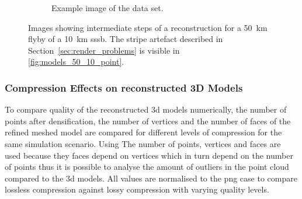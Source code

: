 \begin{figure}[htb]
\begin{subfigure}[b]{0.42\textwidth}
            \caption{Example image of the data set.}
            \label{fig:models_50_10_img}
        \end{subfigure}
    \caption{Images showing intermediate steps of a reconstruction for a \SI{50}{\kilo\meter} flyby of a \SI{10}{\kilo\meter} \gls{sssb}. The stripe artefact described in Section~\ref{sec:render_problems} is visible in \ref{fig:models_50_10_point}.}
    \label{fig:models_50_10}
\end{figure}


\subsubsection{Compression Effects on reconstructed 3D Models}
To compare  quality of the reconstructed \gls{3d} models numerically, the number of points after densification, the number of vertices and the number of faces of the refined meshed model are compared for different levels of compression for the same simulation scenario. Using The number of points, vertices and faces are used because they faces depend on vertices which in turn depend on the number of points thus it is possible to analyse the amount of outliers in the point cloud compared to the \gls{3d} models. All values are normalised to the \gls{png} case to compare lossless compression against lossy compression with varying quality levels.

